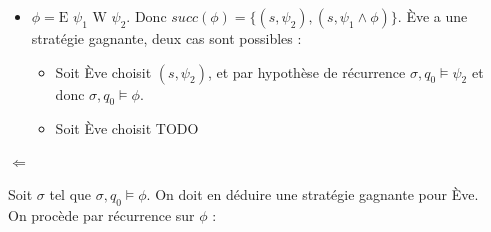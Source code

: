 \documentclass[10pt,a4paper]{article}
\begin{document}
\begin{itemize}
\item $\phi = \mbox{E } \psi_1 \mbox{ W } \psi_2$. Donc $succ(\phi) = \{ (s,\psi_2), (s, \psi_1 \land \phi) \}$. Ève a une stratégie gagnante, deux cas sont possibles :
\begin{itemize}
	\item Soit Ève choisit $(s,\psi_2)$, et par hypothèse de récurrence $\sigma, q_0 \vDash \psi_2$ et donc $\sigma, q_0 \vDash \phi$.
	\item Soit Ève choisit TODO
\end{itemize}
\end{itemize}

\paragraph{$\Longleftarrow$}
Soit $\sigma$ tel que $\sigma,q_0 \vDash \phi$. On doit en déduire une stratégie gagnante pour Ève.\\
On procède par récurrence sur $\phi$ :
\end{document}

